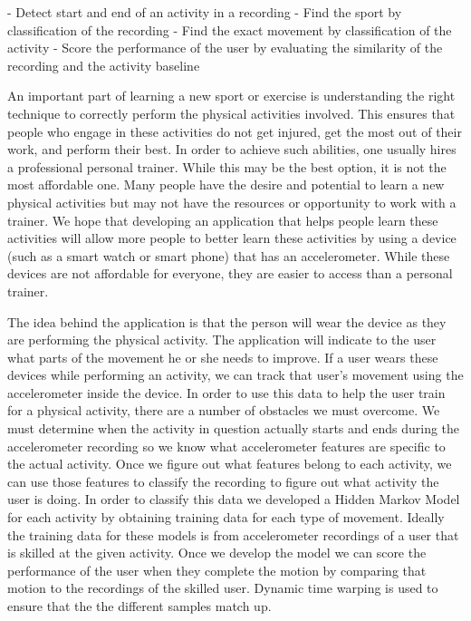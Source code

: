 - Detect start and end of an activity in a recording
- Find the sport by classification of the recording
- Find the exact movement by classification of the activity
- Score the performance of the user by evaluating the similarity of the recording and the activity baseline

An important part of learning a new sport or exercise is understanding the right technique to correctly perform the physical activities involved. This ensures that people who engage in these activities do not get injured, get the most out of their work, and perform their best. In order to achieve such abilities, one usually hires a professional personal trainer. While this may be the best option, it is not the most affordable one. Many people have the desire and potential to learn a new physical activities but may not have the resources or opportunity to work with a trainer. We hope that developing an application that helps people learn these activities will allow more people to better learn these activities by using a device (such as a smart watch or smart phone) that has an accelerometer. While these devices are not affordable for everyone, they are easier to access than a personal trainer.

	The idea behind the application is that the person will wear the device as they are performing the physical activity. The application will indicate to the user what parts of the movement he or she needs to improve. 	If a user wears these devices while performing an activity, we can track that user’s movement using the accelerometer inside the device. In order to use this data to help the user train for a physical activity, there are a number of obstacles we must overcome. We must determine when the activity in question actually starts and ends during the accelerometer recording so we know what accelerometer features are specific to the actual activity. Once we figure out what features belong to each activity, we can use those features to classify the recording to figure out what activity the user is doing. In order to classify this data we developed a Hidden Markov Model for each activity by obtaining training data for each type of movement. Ideally the training data for these models is from accelerometer recordings of a user that is skilled at the given activity. Once we develop the model we can score the performance of the user when they complete the motion by comparing that motion to the recordings of the skilled user. Dynamic time warping is used to ensure that the the different samples match up.

	
